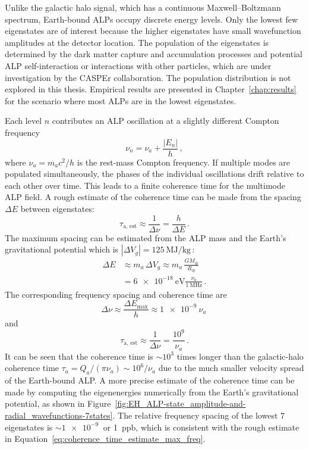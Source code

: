 Unlike the galactic halo signal, which has a continuous Maxwell--Boltzmann spectrum, Earth-bound ALPs occupy discrete energy levels.
Only the lowest few eigenstates are of interest because the higher eigenstates have small wavefunction amplitudes at the detector location.
The population of the eigenstates is determined by the dark matter capture and accumulation processes and potential ALP self-interaction or interactions with other particles, which are under investigation by the CASPEr collaboration.
The population distribution is not explored in this thesis.
Empirical results are presented in Chapter~\ref{chap:results} for the scenario where most ALPs are in the lowest eigenstates.

Each level $n$ contributes an ALP oscillation at a slightly different Compton frequency
\begin{equation}
    \nu_n = \nu_a + \frac{|E_n|}{h}
    \,,\label{eq:nu_bound}
\end{equation}
where $\nu_a = m_a c^2/h$ is the rest-mass Compton frequency.
If multiple modes are populated simultaneously, the phases of the individual oscillations drift relative to each other over time.
This leads to a finite coherence time for the multimode ALP field.
A rough estimate of the coherence time can be made from the spacing $\Delta E$ between eigenstates:
\begin{equation}
    \tau_\mathrm{a,\,est} \approx \frac{1}{\Delta \nu} = \frac{h}{\Delta E}
    \,.\label{eq:coherence_time_estimate}
\end{equation}
The maximum spacing can be estimated from the ALP mass and the Earth's gravitational potential which is $|\Delta V_g| = \SI{125}{\mega\joule\per\kg}$\,\cite{Zhang2026_Dissertation_ipynb_2_theory_EH_ALP}:
\begin{align}
    \Delta E &\approx m_a\,\Delta V_g \approx m_a\,\frac{G M_\oplus}{R_\oplus}\\
    & = \SI{6e-18}{\eV}\frac{\nu_a}{\SI{1}{\mega\hertz}}
    \,.\label{eq:coherence_time_estimate_max}
\end{align}
The corresponding frequency spacing and coherence time are
\begin{equation}
    \Delta\nu \approx \frac{\Delta E_\mathrm{max}}{h} \approx \SI{1e-9}{}\nu_a
    \,\label{eq:coherence_time_estimate_max_freq}
\end{equation}
and
\begin{equation}
    \tau_\mathrm{a,\,est} \approx \frac{1}{\Delta\nu} = \frac{10^9}{\nu_a}
    \,.\label{eq:coherence_time_estimate_max_value}
\end{equation}
It can be seen that the coherence time is $\sim 10^3$ times longer than the galactic-halo coherence time $\tau_a = Q_a/(\pi \nu_a) \sim 10^6/\nu_a$ due to the much smaller velocity spread of the Earth-bound ALP.
A more precise estimate of the coherence time can be made by computing the eigenenergies numerically from the Earth's gravitational potential, as shown in Figure~\ref{fig:EH_ALP-state_amplitude-and-radial_wavefunctions-7states}.
The relative frequency spacing of the lowest 7 eigenstates is $\sim \SI{1e-9}{}$ or \SI{1}{ppb}, which is consistent with the rough estimate in Equation~\eqref{eq:coherence_time_estimate_max_freq}.

